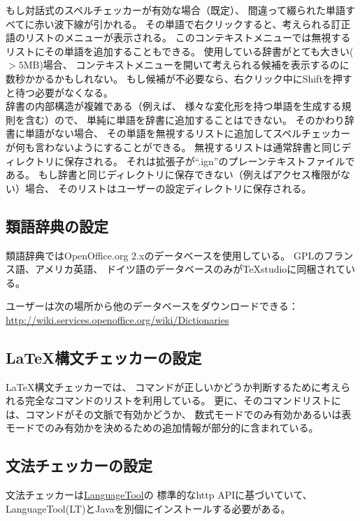 もし対話式のスペルチェッカーが有効な場合（既定）、
間違って綴られた単語すべてに赤い波下線が引かれる。
その単語で右クリックすると、考えられる訂正語のリストのメニューが表示される。
このコンテキストメニューでは無視するリストにその単語を追加することもできる。
使用している辞書がとても大きい(${}>5\mathrm{MB}$)場合、
コンテキストメニューを開いて考えられる候補を表示するのに数秒かかるかもしれない。
もし候補が不必要なら、右クリック中にShiftを押すと待つ必要がなくなる。
\\

辞書の内部構造が複雑である（例えば、
様々な変化形を持つ単語を生成する規則を含む）ので、
単純に単語を辞書に追加することはできない。
そのかわり辞書に単語がない場合、
その単語を無視するリストに追加してスペルチェッカーが何も言わないようにすることができる。
無視するリストは通常辞書と同じディレクトリに保存される。
それは拡張子が``.ign''のプレーンテキストファイルである。
もし辞書と同じディレクトリに保存できない（例えばアクセス権限がない）場合、
そのリストはユーザーの設定ディレクトリに保存される。

\subsection{類語辞典の設定}

類語辞典ではOpenOffice.org 2.xのデータベースを使用している。
GPLのフランス語、アメリカ英語、
ドイツ語のデータベースのみがTeXstudioに同梱されている。

ユーザーは次の場所から他のデータベースをダウンロードできる：
\href{http://wiki.services.openoffice.org/wiki/Dictionaries}{http://wiki.services.openoffice.org/wiki/Dictionaries}

\subsection{LaTeX構文チェッカーの設定}

LaTeX構文チェッカーでは、
コマンドが正しいかどうか判断するために考えられる完全なコマンドのリストを利用している。
更に、そのコマンドリストには、コマンドがその文脈で有効かどうか、
数式モードでのみ有効かあるいは表モードでのみ有効かを決めるための追加情報が部分的に含まれている。

\subsection{文法チェッカーの設定}

文法チェッカーは\href{http://www.languagetool.org/}{LanguageTool}の
標準的なhttp APIに基づいていて、LanguageTool(LT)とJavaを別個にインストールする必要がある。

